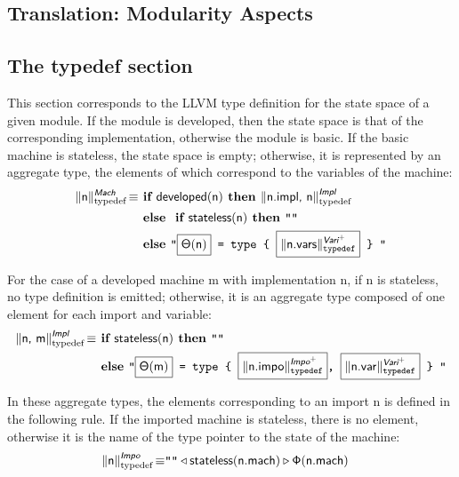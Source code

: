 \documentclass{llncs}
\newcommand{\trad}[2]{\ensuremath{\lVert \textsf{#1} \rVert^{\textit{#2}}}}
\DeclareMathOperator{\isdef}{\equiv}
\newcommand{\llvm}[1]{\texttt{#1}}
\newcommand{\B}[1]{\textsf{#1}}
\newcommand{\ListOf}[1]{$\mbox{#1}^+$}
\newcommand{\IF}[0]{\textbf{ if }}
\newcommand{\ELSE}[0]{\textbf{ else }}
\newcommand{\THEN}[0]{\textbf{ then }}
\newcommand{\PH}[1]{\framebox{$#1$}}
\newcommand{\developed}[0]{\ensuremath{\textsf{developed}}}
\newcommand{\stateless}[0]{\ensuremath{\textsf{stateless}}}
\newcommand{\state}[0]{\ensuremath{\sf\Theta}}
\newcommand{\stateref}[0]{\ensuremath{\sf\Phi}}
\begin{document}
\begin{enumerate}
\section{Translation: Modularity Aspects}
\label{sec:module}

\subsection{The typedef section}

This section corresponds to the LLVM type definition for the state space of a
given module. If the module is developed, then the state space is that of the
corresponding implementation, otherwise the module is basic. If the basic
machine is stateless, the state space is empty; otherwise, it is represented by
an aggregate type, the elements of which correspond to the variables of the
machine:
\begin{align*}
  \trad{\B{n}}{\B{Mach}}_{\text{typedef}} \isdef 
  & \IF \developed(\B{n}) \THEN \trad{\B{n.impl}, \B{n}}{\B{Impl}}_{\text{typedef}} \\
  & \ELSE \IF \stateless(\B{n}) \THEN \llvm{""} \\
  & \ELSE \llvm{"\PH{\state(\B{n})} = type \{ \PH{\trad{\B{n.vars}}{\ListOf{\B{Vari}}}_{\text{typedef}}} \} "}
\end{align*}

For the case of a developed machine \B{m} with implementation \B{n}, if \B{n} is
stateless, no type definition is emitted; otherwise, it is an aggregate type
composed of one element for each import and variable:
\begin{align*}
  \trad{\B{n}, \B{m}}{\B{Impl}}_{\text{typedef}} \isdef 
  & \IF \stateless(\B{n}) \THEN \llvm{""} \\
  & \ELSE \llvm{"\PH{\state(\B{m})} = type \{ \PH{\trad{\B{n.impo}}{\ListOf{\B{Impo}}}_{\text{typedef}}}, \PH{\trad{\B{n.var}}{\ListOf{\B{Vari}}}_{\text{typedef}}} \} "}
\end{align*}

In these aggregate types, the elements corresponding to an import \B{n} is
defined in the following rule. If the imported machine is stateless, there is no
element, otherwise it is the name of the type pointer to the state of the
machine:
\begin{align*}
  \trad{\B{n}}{\B{Impo}}_{\text{typedef}} \isdef 
  & \llvm{""} \triangleleft \stateless(\B{n.mach}) \triangleright \stateref(\B{n.mach})
\end{align*}


\end{enumerate}
\end{document}
